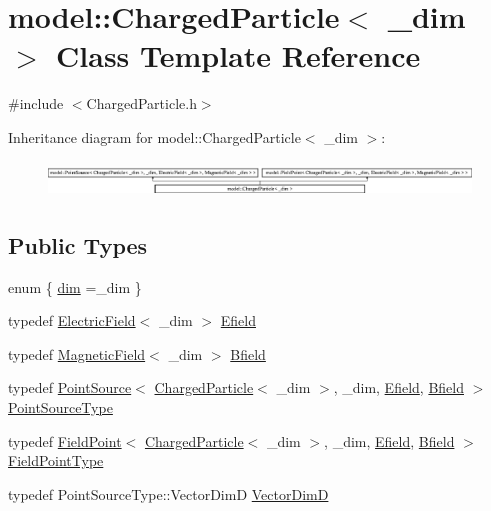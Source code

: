 \hypertarget{classmodel_1_1_charged_particle}{}\section{model\+:\+:Charged\+Particle$<$ \+\_\+dim $>$ Class Template Reference}
\label{classmodel_1_1_charged_particle}


{\ttfamily \#include $<$Charged\+Particle.\+h$>$}

Inheritance diagram for model\+:\+:Charged\+Particle$<$ \+\_\+dim $>$\+:\begin{figure}[H]
\begin{center}
\leavevmode
\includegraphics[height=0.936455cm]{classmodel_1_1_charged_particle}
\end{center}
\end{figure}
\subsection*{Public Types}
\begin{DoxyCompactItemize}
\item 
enum \{ \hyperlink{classmodel_1_1_charged_particle_a846076bee7d323a23c742e13b93a5d85a883743e7ebeeeeaa68048df207959118}{dim} =\+\_\+dim
 \}
\item 
typedef \hyperlink{structmodel_1_1_electric_field}{Electric\+Field}$<$ \+\_\+dim $>$ \hyperlink{classmodel_1_1_charged_particle_a2b7dfa8b171bbc5d473730136c484161}{Efield}
\item 
typedef \hyperlink{structmodel_1_1_magnetic_field}{Magnetic\+Field}$<$ \+\_\+dim $>$ \hyperlink{classmodel_1_1_charged_particle_ae20fd0eb3401c71ca0f4e48b89aae709}{Bfield}
\item 
typedef \hyperlink{structmodel_1_1_point_source}{Point\+Source}$<$ \hyperlink{classmodel_1_1_charged_particle}{Charged\+Particle}$<$ \+\_\+dim $>$, \+\_\+dim, \hyperlink{classmodel_1_1_charged_particle_a2b7dfa8b171bbc5d473730136c484161}{Efield}, \hyperlink{classmodel_1_1_charged_particle_ae20fd0eb3401c71ca0f4e48b89aae709}{Bfield} $>$ \hyperlink{classmodel_1_1_charged_particle_ab17dac856176be5f7d8394283d087783}{Point\+Source\+Type}
\item 
typedef \hyperlink{structmodel_1_1_field_point}{Field\+Point}$<$ \hyperlink{classmodel_1_1_charged_particle}{Charged\+Particle}$<$ \+\_\+dim $>$, \+\_\+dim, \hyperlink{classmodel_1_1_charged_particle_a2b7dfa8b171bbc5d473730136c484161}{Efield}, \hyperlink{classmodel_1_1_charged_particle_ae20fd0eb3401c71ca0f4e48b89aae709}{Bfield} $>$ \hyperlink{classmodel_1_1_charged_particle_a0a40d2605cb1ace9a6277c5b61cb5733}{Field\+Point\+Type}
\item 
typedef Point\+Source\+Type\+::\+Vector\+Dim\+D \hyperlink{classmodel_1_1_charged_particle_a31a77e0315958d087309087da65b422d}{Vector\+Dim\+D}
\end{DoxyCompactItemize}
